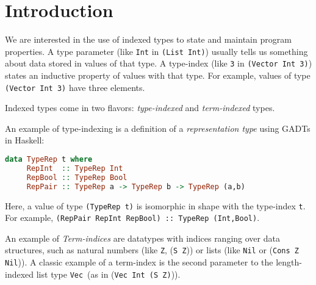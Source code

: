 \section{Introduction} \label{intro}


We are interested in the use of indexed types to state and
maintain program properties. A type parameter
(like {\tt Int} in {\tt (List Int)}) usually tells us
something about data stored in values of that type.
A type-index (like {\tt 3} in {\tt (Vector Int 3)}) states
an inductive property of values with that type. For example,
values of type {\tt (Vector Int 3)} have three elements.

Indexed types come in two flavors: \emph{type-indexed} and \emph{term-indexed}
types. 


An example of type-indexing is a definition of a \emph{representation type}
\cite{Crary98} using GADTs in Haskell:\vspace*{-2pt}
\begin{lstlisting}[basicstyle={\ttfamily\small},language=Haskell,mathescape]
   data TypeRep t where
     RepInt  :: TypeRep Int
     RepBool :: TypeRep Bool
     RepPair :: TypeRep a -> TypeRep b -> TypeRep (a,b)
\end{lstlisting}\vspace*{-2pt}
Here, a value of type {\tt\small (TypeRep t)} is isomorphic in shape with
the type-index {\tt t}. For example,
{\tt (RepPair RepInt RepBool) :: TypeRep (Int,Bool)}.


An example of {\it Term-indices} are datatypes with
indices ranging over data structures, such as natural numbers
(like {\tt Z}, {(\tt S Z})) or lists (like {\tt Nil} or ({\tt Cons Z Nil})). 
A classic example of a term-index is the second parameter to
the length-indexed list type {\tt Vec}~(as in ({\tt Vec Int (S Z)})).

